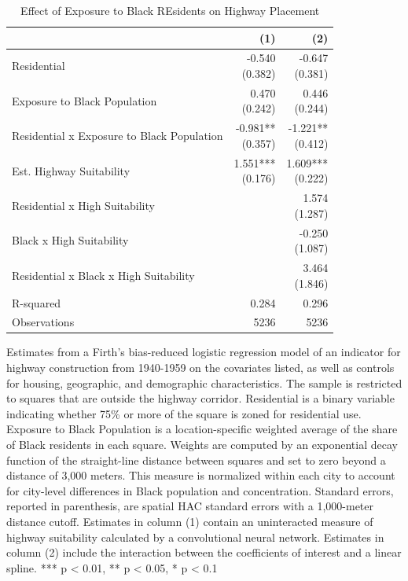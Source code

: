 \begin{table}[h]
\centering
\caption{Effect of Exposure to Black REsidents on Highway Placement}
\label{tab:outside_corridor_black_share}
\begin{threeparttable}
\begin{tabular*}{0.8\textwidth}{@{\extracolsep{\fill}}l*{2}{r}}
\toprule
 & (1) & (2) \\
\midrule
Residential & \makecell[tr]{-0.540 \\ (0.382)} & \makecell[tr]{-0.647 \\ (0.381)} \\
Exposure to Black Population & \makecell[tr]{0.470 \\ (0.242)} & \makecell[tr]{0.446 \\ (0.244)} \\
Residential x Exposure to Black Population & \makecell[tr]{-0.981{**} \\ (0.357)} & \makecell[tr]{-1.221{**} \\ (0.412)} \\
Est. Highway Suitability & \makecell[tr]{1.551{***} \\ (0.176)} & \makecell[tr]{1.609{***} \\ (0.222)} \\
Residential x High Suitability &  & \makecell[tr]{1.574 \\ (1.287)} \\
Black x High Suitability &  & \makecell[tr]{-0.250 \\ (1.087)} \\
Residential x Black x High Suitability &  & \makecell[tr]{3.464 \\ (1.846)} \\
R-squared & 0.284 & 0.296 \\
Observations & 5236 & 5236 \\
\bottomrule
\end{tabular*}
\begin{tablenotes}[flushleft]
\footnotesize
\item Estimates from a Firth's bias-reduced logistic regression model of an indicator for highway construction from 1940-1959 on the covariates listed, as well as controls for housing, geographic, and demographic characteristics. The sample is restricted to squares that are outside the highway corridor. Residential is a binary variable indicating whether 75\% or more of the square is zoned for residential use. Exposure to Black Population is a location-specific weighted average of the share of Black residents in each square. Weights are computed by an exponential decay function of the straight-line distance between squares and set to zero beyond a distance of 3,000 meters. This measure is normalized within each city to account for city-level differences in Black population and concentration. Standard errors, reported in parenthesis, are \textcite{conley_gmm_1999} spatial HAC standard errors with a 1,000-meter distance cutoff. Estimates in column (1) contain an uninteracted measure of highway suitability calculated by a convolutional neural network. Estimates in column (2) include the interaction between the coefficients of interest and a linear spline. *** p < 0.01, ** p < 0.05, * p < 0.1

\end{tablenotes}
\end{threeparttable}
\end{table}
